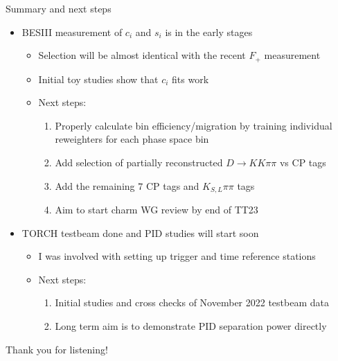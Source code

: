 \documentclass{beamer}
\begin{document}
\begin{frame}{Summary and next steps}
  \begin{itemize}
    \setlength\itemsep{1.0em}
    \item{BESIII measurement of $c_i$ and $s_i$ is in the early stages}
    \begin{itemize}
      \item{Selection will be almost identical with the recent $F_+$ measurement}
      \item{Initial toy studies show that $c_i$ fits work}
      \item{Next steps:}
      \begin{enumerate}
        \item{Properly calculate bin efficiency/migration by training individual reweighters for each phase space bin}
        \item{Add selection of partially reconstructed $D\to KK\pi\pi$ vs CP tags}
        \item{Add the remaining $7$ CP tags and $K_{S, L}\pi\pi$ tags}
        \item{Aim to start charm WG review by end of TT23}
      \end{enumerate}
    \end{itemize}
    \item{TORCH testbeam done and PID studies will start soon}
    \begin{itemize}
      \item{I was involved with setting up trigger and time reference stations}
      \item{Next steps:}
      \begin{enumerate}
        \item{Initial studies and cross checks of November 2022 testbeam data}
        \item{Long term aim is to demonstrate PID separation power directly}
      \end{enumerate}
    \end{itemize}
  \end{itemize}
  \begin{center}
    \huge Thank you for listening!
  \end{center}
\end{frame}
\end{document}
